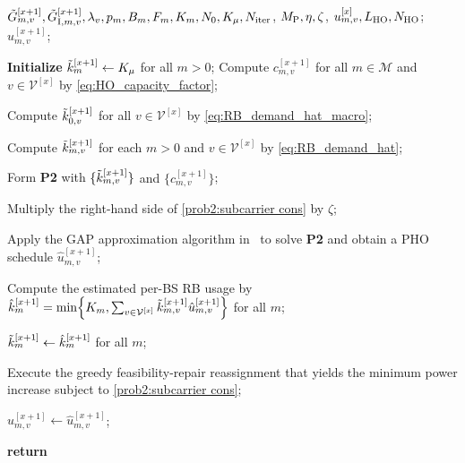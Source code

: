 \documentclass[10pt,journal,letterpaper]{IEEEtran}
\newcommand{\rev}[1]{\textcolor{revisioncolor}{{}#1}}
\newcommand{\omitted}[1]{}
\theoremstyle{remark}
\begin{document}
\begin{algorithm}[htbp]
    \caption{Generalized Assignment-based Proactive Handover (GAP-HO)}
    \label{alg:GAP-HO}
    \renewcommand{\algorithmicrequire}{\textbf{Input:}}
    \renewcommand{\algorithmicensure}{\textbf{Output:}}
    \begin{algorithmic}[1]
        \REQUIRE
        $\Tilde{G}_{m,v}^{[x+1]}, \Tilde{G}_{{\rm I},m,v}^{[x+1]}, \lambda_v, p_m, B_m, F_m, K_m, N_0, K_\mu, N_{\rm iter}$, $M_{\rm P}, \eta, \zeta$\omitted{}\rev{, $u_{m,v}^{[x]}, L_{\rm HO}, N_{\rm HO}$};
        \ENSURE
        $u_{m,v}^{[x+1]}$;

        \STATE \textbf{Initialize} $\Tilde{k}_{m}^{[x+1]} \gets K_\mu$ for all $m>0$;
        \STATE \rev{Compute $c_{m,v}^{[x+1]}$ for all $m \in \mathcal{M}$ and $v \in \mathcal{V}^{[x]}$ by \eqref{eq:HO_capacity_factor};}

        \STATE Compute $\Tilde{k}_{0,v}^{[x+1]}$ for all $v \in \mathcal{V}^{[x]}$
        by \eqref{eq:RB_demand_hat_macro};

            \STATE Compute $\Tilde{k}_{m,v}^{[x+1]}$ for each $m>0$ and $v \in \mathcal{V}^{[x]}$ by \eqref{eq:RB_demand_hat};

            \STATE Form \textbf{P2} with $\{\Tilde{k}_{m,v}^{[x+1]}\}$\rev{ and $\{c_{m,v}^{[x+1]}\}$};
            
                \STATE Multiply the right-hand side of \eqref{prob2:subcarrier cons} by $\zeta$;
            \ENDWHILE

            \STATE Apply the GAP approximation algorithm in~\cite{shmoys1993approximation}
                   to solve \textbf{P2} and obtain a PHO schedule
                   $\hat{u}_{m,v}^{[x+1]}$;

            \STATE Compute the \omitted{}\rev{estimated} per-BS RB usage
            \omitted{}\rev{by \\ $\hat{k}_{m}^{[x+1]} = \min\!\left\{K_m,\sum_{v \in \mathcal{V}^{[x]}}\Tilde{k}_{m,v}^{[x+1]} \hat{u}_{m,v}^{[x+1]}\right\}$} for all $m$;

            \STATE \rev{$\Tilde{k}_{m}^{[x+1]} \gets \hat{k}_{m}^{[x+1]}$ for all $m$;}
        \ENDFOR

        
            \STATE Execute the greedy feasibility-repair reassignment that yields the minimum power increase\rev{ subject to \eqref{prob2:subcarrier cons}};
        \ENDWHILE

        \STATE $u_{m,v}^{[x+1]} \leftarrow \hat{u}_{m,v}^{[x+1]}$;

        \STATE \textbf{return}
    \end{algorithmic}
\end{algorithm}
\end{document}
